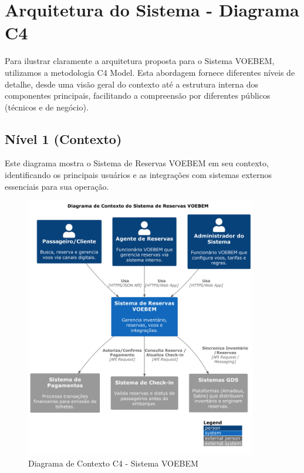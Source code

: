\chapter{Arquitetura do Sistema - Diagrama C4}
\label{chap:arquitetura-c4}

Para ilustrar claramente a arquitetura proposta para o Sistema VOEBEM, utilizamos a metodologia C4 Model. Esta abordagem fornece diferentes níveis de detalhe, desde uma visão geral do contexto até a estrutura interna dos componentes principais, facilitando a compreensão por diferentes públicos (técnicos e de negócio).

\section{Nível 1 (Contexto)}
\label{sec:c4-contexto}

Este diagrama mostra o Sistema de Reservas VOEBEM em seu contexto, identificando os principais usuários e as integrações com sistemas externos essenciais para sua operação.

\begin{figure}[htbp]
    \centering
    \includegraphics[width=0.9\textwidth]{assets/c4-n1-contexto.pdf}
    \caption{Diagrama de Contexto C4 - Sistema VOEBEM}
    \label{fig:c4-contexto}
\end{figure}


